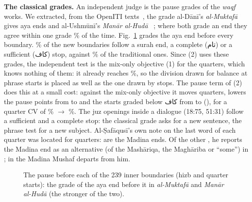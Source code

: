 \documentclass[conference]{IEEEtran}
\newcommand{\ar}[1]{\mbox{\textarabic{#1}}}
\begin{document}
\textbf{The classical grades.} An independent judge is the pause grades of the \emph{waqf} works.
We extracted, from the OpenITI texts~\cite{openiti}, the grade al-Dānī's \emph{al-Muktafā} gives
\StopsMuktafa{} aya ends and al-Ushmūnī's \emph{Manār al-Hudā} \StopsManar~\cite{muktafa,manar};
where both grade an end they agree within one grade \StopsNear\% of the time. Fig.~\ref{fig:grades}
grades the aya end before every boundary. \GradeNewStrong\% of the new boundaries follow a surah
end, a complete (\ar{تام}) or a sufficient (\ar{كاف}) stop, against \GradeTradStrong\% of the
traditional ones. Since (2) uses these grades, the independent test is the mix-only objective (1)
for the quarters, which knows nothing of them: it already reaches \MixStrong\%, so the division
drawn for balance at phrase starts is placed as well as the one drawn by stops.
The pause term of (2) does this at a small cost: against the mix-only objective it moves
\PauseMoved{} quarters, lowers the pause points from \MixPts{} to \NewPts{} and the starts graded
below \ar{كاف} from \MixWeak{} to \NewWeakN{} (\NewWeakList), for a quarter CV of \MixRubCV\%
$\to$ \NewRubCV\%. The juz openings inside a dialogue (18:75, 51:31) follow a
sufficient and a complete stop: the classical grade asks for a new sentence, the phrase test for a
new subject. Al-Ṣafāqusī's own note on the last word of each quarter was located for
\GhaythLocated{} quarters: \GhaythSame{} are the Madina ends. Of the other \GhaythDiff, he reports
the Madina end as an alternative (of the Mashāriqa, the Maghāriba or ``some'') in \GhaythAlt; in
\GhaythDepart{} the Madina Mushaf departs from him.

\begin{figure}[t]
\centering
{}
\caption{The pause before each of the 239 inner boundaries (hizb and quarter starts): the grade of
the aya end before it in \emph{al-Muktafā} and \emph{Manār al-Hudā} (the stronger of the two).}
\label{fig:grades}
\end{figure}
\end{document}
